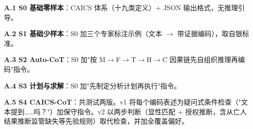 \documentclass[11pt]{article}
\begin{document}
\textbf{A.1 S0 {\cjkfont 基\allowbreak 础\allowbreak 零\allowbreak 样\allowbreak 本}}{\cjkfont ：}CAICS {\cjkfont 体\allowbreak 系\allowbreak （\allowbreak 十\allowbreak 九\allowbreak 类\allowbreak 定\allowbreak 义\allowbreak ）}+ JSON {\cjkfont 输\allowbreak 出\allowbreak 格\allowbreak 式\allowbreak ，\allowbreak 无\allowbreak 推\allowbreak 理\allowbreak 引\allowbreak 导\allowbreak 。}

\textbf{A.2 S1 {\cjkfont 基\allowbreak 础\allowbreak 少\allowbreak 样\allowbreak 本}}{\cjkfont ：}S0 {\cjkfont 加\allowbreak 三\allowbreak 个\allowbreak 专\allowbreak 家\allowbreak 标\allowbreak 注\allowbreak 示\allowbreak 例\allowbreak （\allowbreak 文\allowbreak 本} $\rightarrow$ {\cjkfont 带\allowbreak 证\allowbreak 据\allowbreak 编\allowbreak 码\allowbreak ）\allowbreak ，\allowbreak 取\allowbreak 自\allowbreak 银\allowbreak 标\allowbreak 准\allowbreak 。}

\textbf{A.3 S2 Auto-CoT}{\cjkfont ：}S0 {\cjkfont 加}"{\cjkfont 按} M$\rightarrow$F$\rightarrow$T$\rightarrow$H$\rightarrow$C {\cjkfont 因\allowbreak 果\allowbreak 链\allowbreak 先\allowbreak 自\allowbreak 组\allowbreak 织\allowbreak 推\allowbreak 理\allowbreak 再\allowbreak 编\allowbreak 码}"{\cjkfont 指\allowbreak 令\allowbreak 。}

\textbf{A.4 S3 {\cjkfont 计\allowbreak 划\allowbreak 与\allowbreak 求\allowbreak 解}}{\cjkfont ：}S0 {\cjkfont 加}"{\cjkfont 先\allowbreak 制\allowbreak 定\allowbreak 分\allowbreak 析\allowbreak 计\allowbreak 划\allowbreak 再\allowbreak 执\allowbreak 行}"{\cjkfont 指\allowbreak 令\allowbreak 。}

\textbf{A.5 S4 CAICS-CoT}{\cjkfont ：\allowbreak 共\allowbreak 测\allowbreak 试\allowbreak 两\allowbreak 版\allowbreak 。}v1 {\cjkfont 将\allowbreak 每\allowbreak 个\allowbreak 编\allowbreak 码\allowbreak 表\allowbreak 述\allowbreak 为\allowbreak 疑\allowbreak 问\allowbreak 式\allowbreak 条\allowbreak 件\allowbreak 检\allowbreak 查\allowbreak （}"{\cjkfont 文\allowbreak 本\allowbreak 提\allowbreak 到}……{\cjkfont 吗\allowbreak ？}"{\cjkfont ）\allowbreak 加\allowbreak 保\allowbreak 守\allowbreak 指\allowbreak 令\allowbreak 。}v2 {\cjkfont 以\allowbreak 两\allowbreak 步\allowbreak 判\allowbreak 断\allowbreak （\allowbreak 显\allowbreak 性\allowbreak 匹\allowbreak 配} + {\cjkfont 授\allowbreak 权\allowbreak 推\allowbreak 断\allowbreak ，\allowbreak 含\allowbreak 从\allowbreak 亡\allowbreak 人\allowbreak 结\allowbreak 果\allowbreak 推\allowbreak 断\allowbreak 监\allowbreak 管\allowbreak 缺\allowbreak 失\allowbreak 等\allowbreak 先\allowbreak 验\allowbreak 规\allowbreak 则\allowbreak ）\allowbreak 取\allowbreak 代\allowbreak 检\allowbreak 查\allowbreak ，\allowbreak 并\allowbreak 加\allowbreak 全\allowbreak 覆\allowbreak 盖\allowbreak 偏\allowbreak 好\allowbreak 。}
\end{document}
